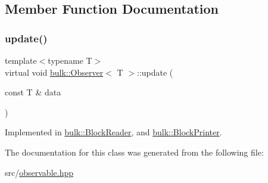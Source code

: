 \subsection{Member Function Documentation}
\mbox{\label{classbulk_1_1Observer_af17104660bf8b287e467213c4efbee2e}} 
\subsubsection{\texorpdfstring{update()}{update()}}
{\footnotesize\ttfamily template$<$typename T$>$ \\
virtual void \hyperlink{classbulk_1_1Observer}{bulk\+::\+Observer}$<$ T $>$\+::update (\begin{DoxyParamCaption}\item[{const T \&}]{data }\end{DoxyParamCaption})\hspace{0.3cm}{\ttfamily [pure virtual]}}



Implemented in \hyperlink{classbulk_1_1BlockReader_a0a3b9ff69552b233b037afcd7e858ef1}{bulk\+::\+Block\+Reader}, and \hyperlink{classbulk_1_1BlockPrinter_a9f961b39d2c0bf9112524bf6773bb3e1}{bulk\+::\+Block\+Printer}.



The documentation for this class was generated from the following file\+:\begin{DoxyCompactItemize}
\item 
src/\hyperlink{observable_8hpp}{observable.\+hpp}\end{DoxyCompactItemize}
